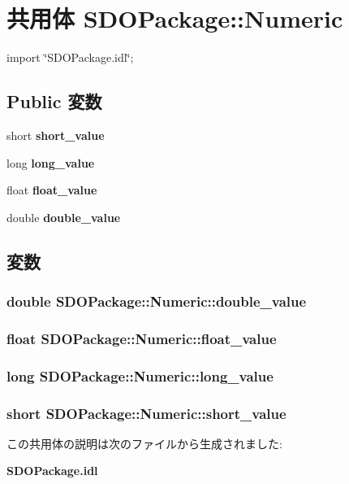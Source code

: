 \section{共用体 SDOPackage::Numeric}
\label{unionSDOPackage_1_1Numeric}


{\ttfamily import \char`\"{}SDOPackage.idl\char`\"{};}

\subsection*{Public 変数}
\begin{DoxyCompactItemize}
\item 
short {\bf short\_\-value}
\item 
long {\bf long\_\-value}
\item 
float {\bf float\_\-value}
\item 
double {\bf double\_\-value}
\end{DoxyCompactItemize}


\subsection{変数}
\subsubsection[{double\_\-value}]{\setlength{\rightskip}{0pt plus 5cm}double {\bf SDOPackage::Numeric::double\_\-value}}\label{unionSDOPackage_1_1Numeric_aa6b082202442d38b557483d5d0d0d9ec}
\subsubsection[{float\_\-value}]{\setlength{\rightskip}{0pt plus 5cm}float {\bf SDOPackage::Numeric::float\_\-value}}\label{unionSDOPackage_1_1Numeric_af8a208ebea5bb57d21e277f45b638a90}
\subsubsection[{long\_\-value}]{\setlength{\rightskip}{0pt plus 5cm}long {\bf SDOPackage::Numeric::long\_\-value}}\label{unionSDOPackage_1_1Numeric_a925fa3b9f2f43b001183cdc5f6e60c91}
\subsubsection[{short\_\-value}]{\setlength{\rightskip}{0pt plus 5cm}short {\bf SDOPackage::Numeric::short\_\-value}}\label{unionSDOPackage_1_1Numeric_a37ea8e10da99b8d6147d59bb8bf1588b}


この共用体の説明は次のファイルから生成されました:\begin{DoxyCompactItemize}
\item 
{\bf SDOPackage.idl}\end{DoxyCompactItemize}
